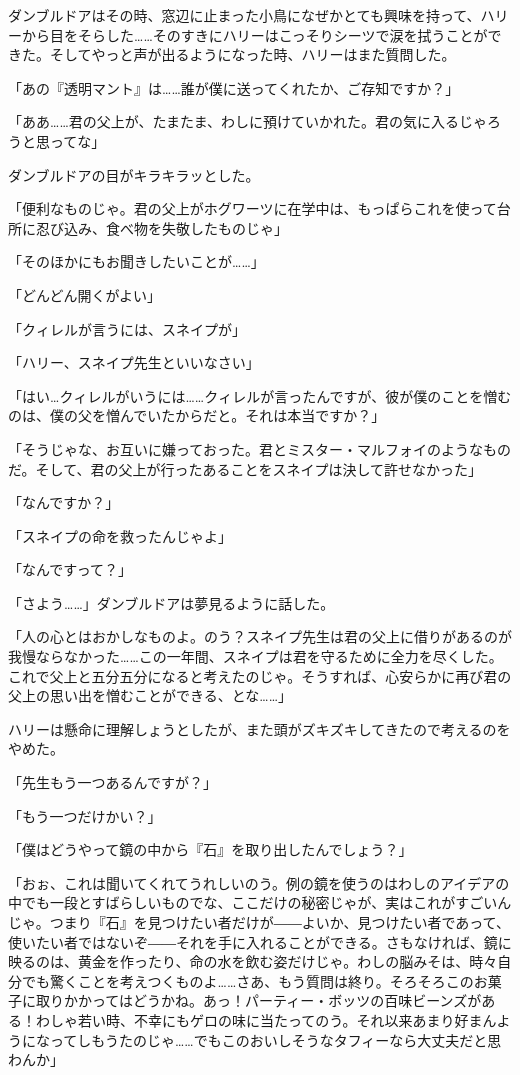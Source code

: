 \documentclass[10pt,a4paper]{article}
\begin{document}
\begin{CJK}{UTF8}{min}
ダンブルドアはその時、窓辺に止まった小鳥になぜかとても興味を持って、ハリーから目をそらした……そのすきにハリーはこっそりシーツで涙を拭うことができた。そしてやっと声が出るようになった時、ハリーはまた質問した。

「あの『透明マント』は……誰が僕に送ってくれたか、ご存知ですか？」

「ああ……君の父上が、たまたま、わしに預けていかれた。君の気に入るじゃろうと思ってな」

ダンブルドアの目がキラキラッとした。

「便利なものじゃ。君の父上がホグワーツに在学中は、もっぱらこれを使って台所に忍び込み、食べ物を失敬したものじゃ」

「そのほかにもお聞きしたいことが……」

「どんどん開くがよい」

「クィレルが言うには、スネイプが」

「ハリー、スネイプ先生といいなさい」

「はい…クィレルがいうには……クィレルが言ったんですが、彼が僕のことを憎むのは、僕の父を憎んでいたからだと。それは本当ですか？」

「そうじゃな、お互いに嫌っておった。君とミスター・マルフォイのようなものだ。そして、君の父上が行ったあることをスネイプは決して許せなかった」

「なんですか？」

「スネイプの命を救ったんじゃよ」

「なんですって？」

「さよう……」ダンブルドアは夢見るように話した。

「人の心とはおかしなものよ。のう？スネイプ先生は君の父上に借りがあるのが我慢ならなかった……この一年間、スネイプは君を守るために全力を尽くした。これで父上と五分五分になると考えたのじゃ。そうすれば、心安らかに再び君の父上の思い出を憎むことができる、とな……」

ハリーは懸命に理解しょうとしたが、また頭がズキズキしてきたので考えるのをやめた。

「先生もう一つあるんですが？」

「もう一つだけかい？」

「僕はどうやって鏡の中から『石』を取り出したんでしょう？」

「おぉ、これは聞いてくれてうれしいのう。例の鏡を使うのはわしのアイデアの中でも一段とすばらしいものでな、ここだけの秘密じゃが、実はこれがすごいんじゃ。つまり『石』を見つけたい者だけが――よいか、見つけたい者であって、使いたい者ではないぞ――それを手に入れることができる。さもなければ、鏡に映るのは、黄金を作ったり、命の水を飲む姿だけじゃ。わしの脳みそは、時々自分でも驚くことを考えつくものよ……さあ、もう質問は終り。そろそろこのお菓子に取りかかってはどうかね。あっ！パーティー・ボッツの百味ビーンズがある！わしゃ若い時、不幸にもゲロの味に当たってのう。それ以来あまり好まんようになってしもうたのじゃ……でもこのおいしそうなタフィーなら大丈夫だと思わんか」


\end{CJK}
\end{document}
